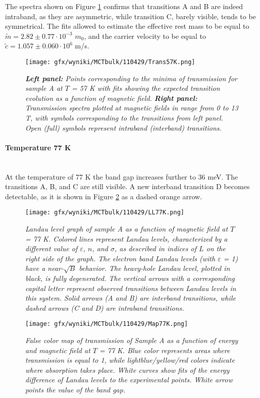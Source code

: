 \documentclass[titlepage,a4paper]{book}
\newcommand{\wciecie}{\quad\phantom{v}}
\newcommand{\myparagraph}[1]{\paragraph{#1}\mbox{}\\}
\begin{document}
The spectra shown on Figure \ref{fig:Spectra_110429_57K} confirms that transitions A and B are indeed intraband, as they are asymmetric, while transition C, barely visible, tends to be symmetrical. The fits allowed to estimate the effective rest mass to be equal to $\tilde m = 2.82 \pm 0.77 \cdot 10^{-3}$ $m_0$, and the carrier velocity to be equal to $\tilde{c} = 1.057 \pm 0.060 \cdot 10^6$ m/s. 

\begin{figure}[H]
	\centering
	\texttt{[image: gfx/wyniki/MCTbulk/110429/Trans57K.png]}
	\vspace{-10pt}
	\caption{\textit{\textbf{Left panel:} Points corresponding to the minima of transmission for sample A at $T$ = 57 K with fits showing the expected transition evolution as a function of magnetic field. \textbf{Right panel:} Transmission spectra plotted at magnetic fields in range from 0 to 13 T, with symbols corresponding to the transitions from left panel. Open (full) symbols represent intraband (interband) transitions.}}
	\label{fig:Spectra_110429_57K}
\end{figure}  

\myparagraph{Temperature 77 K}
\wciecie
At the temperature of 77 K the band gap increases further to 36 meV. The transitions A, B, and C are still visible. A new interband transition D becomes detectable, as it is shown in Figure \ref{fig:LL_110429_77K} as a dashed orange arrow.
\begin{figure}[H]
	\centering
	\texttt{[image: gfx/wyniki/MCTbulk/110429/LL77K.png]}
	\vspace{-10pt}
	\caption{\textit{Landau level graph of sample A as a function of magnetic field at $T$ = 77 K. Colored lines represent Landau levels, characterized by a different value of $\varepsilon$, $n$, and $\sigma$, as described in indices of $L$ on the right side of the graph. The electron band Landau levels (with $\varepsilon$ = 1) have a near-$\sqrt{B}$ behavior. The heavy-hole Landau level, plotted in black, is fully degenerated. The vertical arrows with a corresponding capital letter represent observed transitions between Landau levels in this system. Solid arrows (A and B) are interband transitions, while dashed arrows (C and D) are intraband transitions.}}
	\label{fig:LL_110429_77K}
\end{figure}

\begin{figure}[ht]
	\centering
	\texttt{[image: gfx/wyniki/MCTbulk/110429/Map77K.png]}
	\vspace{-10pt}
	\caption{\textit{False color map of transmission of Sample A as a function of energy and magnetic field at $T$ = 77 K. Blue color represents areas where transmission is equal to 1, while lightblue/yellow/red colors indicate where absorption takes place. White curves show fits of the energy difference of Landau levels to the experimental points. White arrow points the value of the band gap.}}
	\label{fig:Map_110429_77K}
\end{figure} 
\end{document}
